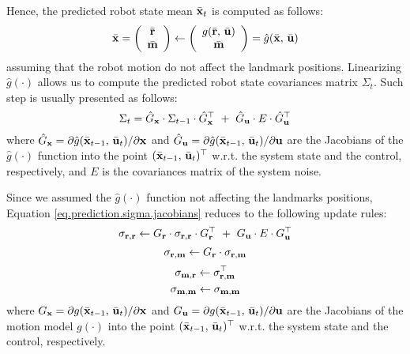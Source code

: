 	Hence, the predicted robot state mean $\bar{\boldsymbol{\mathrm{{x}}}}_t$ is computed as follows:
	\begin{equation}
		\label{eq.prediction.mean.update}
		\bar{\boldsymbol{\mathrm{{x}}}} = 
		\left(\begin{array}{c}
			\bar{\boldsymbol{\mathrm{{r}}}} \\ \bar{\boldsymbol{\mathrm{{m}}}}
		\end{array}\right)
		\leftarrow
		\left(\begin{array}{c}
			g(\bar{\boldsymbol{\mathrm{{r}}}},\, \bar{\boldsymbol{\mathrm{{u}}}}) \\ \bar{\boldsymbol{\mathrm{{m}}}}
		\end{array}\right)
		= \hat{g}(\bar{\boldsymbol{\mathrm{{x}}}},\, \bar{\boldsymbol{\mathrm{{u}}}})
	\end{equation}
	assuming that the robot motion do not affect the landmark positions.
	Linearizing $\hat{g}(\cdot)$ allows us to compute the predicted robot state covariances matrix $\Sigma_t$.
	Such step is usually presented as follows: %
	\begin{equation}
		\label{eq.prediction.sigma.jacobians}
		\Sigma_t = \hat{G}_{\boldsymbol{\mathrm{{x}}}} \cdot \Sigma_{t-1} \cdot \hat{G}^\top_{\boldsymbol{\mathrm{{x}}}} \ + \ \hat{G}_{\boldsymbol{\mathrm{{u}}}} \cdot E \cdot \hat{G}^\top_{\boldsymbol{\mathrm{{u}}}}
	\end{equation}
	where $\hat{G}_{\boldsymbol{\mathrm{{x}}}} = \partial \hat{g}(\bar{\boldsymbol{\mathrm{{x}}}}_{t-1},\, \bar{\boldsymbol{\mathrm{{u}}}}_{t}) / \partial \boldsymbol{\mathrm{{x}}}$ and $\hat{G}_{\boldsymbol{\mathrm{{u}}}} = \partial \hat{g}(\bar{\boldsymbol{\mathrm{{x}}}}_{t-1},\, \bar{\boldsymbol{\mathrm{{u}}}}_{t}) / \partial \boldsymbol{\mathrm{{u}}}$ are the Jacobians of the $\hat{g}(\cdot)$ function into the point $(\bar{\boldsymbol{\mathrm{{x}}}}_{t-1},\, \bar{\boldsymbol{\mathrm{{u}}}}_{t})^\top$ w.r.t. the system state and the control, respectively, and $E$ is the covariances matrix of the system noise. 
	
	Since we assumed the $\hat{g}(\cdot)$ function not affecting the landmarks positions, Equation \ref{eq.prediction.sigma.jacobians} reduces to the following update rules:
	\begin{equation}
		\label{eq.prediction.covs.update.rr}
		\sigma_{\boldsymbol{\mathrm{{r}}},\boldsymbol{\mathrm{{r}}}} \leftarrow G_{\boldsymbol{\mathrm{{r}}}} \cdot \sigma_{\boldsymbol{\mathrm{{r}}},\boldsymbol{\mathrm{{r}}}} \cdot G^\top_{\boldsymbol{\mathrm{{r}}}} \ + \ G_{\boldsymbol{\mathrm{{u}}}} \cdot E \cdot G^\top_{\boldsymbol{\mathrm{{u}}}}
	\end{equation}
	\begin{equation}
		\label{eq.prediction.covs.update.rm}
		\sigma_{\boldsymbol{\mathrm{{r}}},\boldsymbol{\mathrm{{m}}}} \leftarrow G_{\boldsymbol{\mathrm{{r}}}} \cdot \sigma_{\boldsymbol{\mathrm{{r}}},\boldsymbol{\mathrm{{m}}}}
	\end{equation}
	\begin{equation}
		\label{eq.prediction.covs.update.mr}
		\sigma_{\boldsymbol{\mathrm{{m}}},\boldsymbol{\mathrm{{r}}}} \leftarrow \sigma^\top_{\boldsymbol{\mathrm{{r}}},\boldsymbol{\mathrm{{m}}}}
	\end{equation}
	\begin{equation}
		\label{eq.prediction.covs.update.mm}
		\sigma_{\boldsymbol{\mathrm{{m}}},\boldsymbol{\mathrm{{m}}}} \leftarrow \sigma_{\boldsymbol{\mathrm{{m}}},\boldsymbol{\mathrm{{m}}}}
	\end{equation}
	where $G_{\boldsymbol{\mathrm{{x}}}} = \partial g(\bar{\boldsymbol{\mathrm{{x}}}}_{t-1},\, \bar{\boldsymbol{\mathrm{{u}}}}_{t}) / \partial \boldsymbol{\mathrm{{x}}}$ and $G_{\boldsymbol{\mathrm{{u}}}} = \partial g(\bar{\boldsymbol{\mathrm{{x}}}}_{t-1},\, \bar{\boldsymbol{\mathrm{{u}}}}_{t}) / \partial \boldsymbol{\mathrm{{u}}}$ are the Jacobians of the motion model $g(\cdot)$ into the point $(\bar{\boldsymbol{\mathrm{{x}}}}_{t-1},\, \bar{\boldsymbol{\mathrm{{u}}}}_{t})^\top$ w.r.t. the system state and the control, respectively.
	
